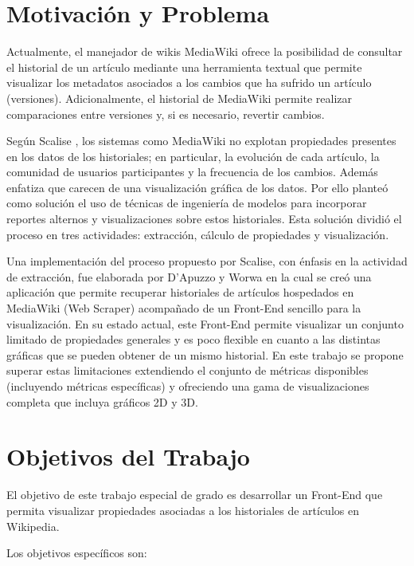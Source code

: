 \section{Motivación y Problema}

Actualmente, el manejador de wikis MediaWiki ofrece la posibilidad de consultar el historial de un artículo mediante una herramienta textual que permite visualizar los metadatos asociados a los cambios que ha sufrido un artículo (versiones). Adicionalmente, el historial de MediaWiki permite realizar comparaciones entre versiones y, si es necesario, revertir cambios.

Según Scalise \cite{Scalise2008a}, los sistemas como MediaWiki no explotan propiedades presentes en los datos de los historiales; en particular, la evolución de cada artículo, la comunidad de usuarios participantes y la frecuencia de los cambios. Además enfatiza que carecen de una visualización gráfica de los datos. Por ello planteó como solución el uso de técnicas de ingeniería de modelos para incorporar reportes alternos y visualizaciones sobre estos historiales. Esta solución dividió el proceso en tres actividades: extracción, cálculo de propiedades y visualización.

Una implementación del proceso propuesto por Scalise, con énfasis en la actividad de extracción, fue elaborada por D'Apuzzo y Worwa \cite{D`Apuzzo2012a} en la cual se creó una aplicación que permite recuperar historiales de artículos hospedados en MediaWiki (Web Scraper) acompañado de un Front-End sencillo para la visualización. En su estado actual, este Front-End permite visualizar un conjunto limitado de propiedades generales y es poco flexible en cuanto a las distintas gráficas que se pueden obtener de un mismo historial.
En este trabajo se propone superar estas limitaciones extendiendo el conjunto de métricas disponibles (incluyendo métricas específicas) y ofreciendo una gama de visualizaciones completa que incluya gráficos 2D y 3D.

\section{Objetivos del Trabajo}

El objetivo de este trabajo especial de grado es desarrollar un Front-End que permita visualizar propiedades asociadas a los historiales de artículos en Wikipedia.

Los objetivos específicos son:

